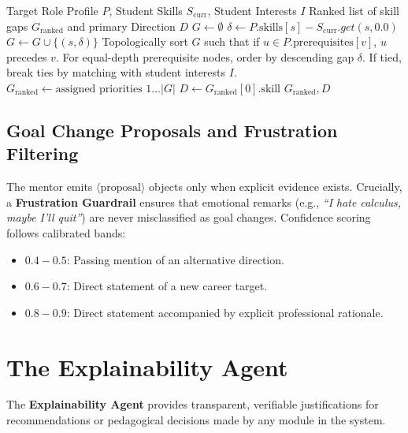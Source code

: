 \documentclass[12pt,a4paper]{article}
\begin{document}
\begin{algorithm}[htbp]
\caption{Prerequisite-Aware Career Gap Ranking}
\label{alg:mentor_ranking}
\begin{algorithmic}[1]
\Require Target Role Profile $P$, Student Skills $S_{\text{curr}}$, Student Interests $I$
\Ensure Ranked list of skill gaps $G_{\text{ranked}}$ and primary Direction $D$
\State $G \gets \emptyset$
    \State $\delta \gets P.\text{skills}[s] - S_{\text{curr}}.get(s, 0.0)$
        \State $G \gets G \cup \{(s, \delta)\}$
    \EndIf
\EndFor
\State Topologically sort $G$ such that if $u \in P.\text{prerequisites}[v]$, $u$ precedes $v$.
\State For equal-depth prerequisite nodes, order by descending gap $\delta$.
\State If tied, break ties by matching with student interests $I$.
\State $G_{\text{ranked}} \gets \text{assigned priorities } 1 \dots |G|$
\State $D \gets G_{\text{ranked}}[0].\text{skill}$
\State \Return $G_{\text{ranked}}, D$
\end{algorithmic}
\end{algorithm}

\subsection{Goal Change Proposals and Frustration Filtering}
The mentor emits $\langle\text{proposal}\rangle$ objects only when explicit evidence exists. Crucially, a \textbf{Frustration Guardrail} ensures that emotional remarks (e.g., \textit{``I hate calculus, maybe I'll quit''}) are never misclassified as goal changes. Confidence scoring follows calibrated bands:
\begin{itemize}[noitemsep]
    \item $0.4 - 0.5$: Passing mention of an alternative direction.
    \item $0.6 - 0.7$: Direct statement of a new career target.
    \item $0.8 - 0.9$: Direct statement accompanied by explicit professional rationale.
\end{itemize}

\section{The Explainability Agent}
\label{sec:explain}

The \textbf{Explainability Agent} provides transparent, verifiable justifications for recommendations or pedagogical decisions made by any module in the system.
\end{document}
